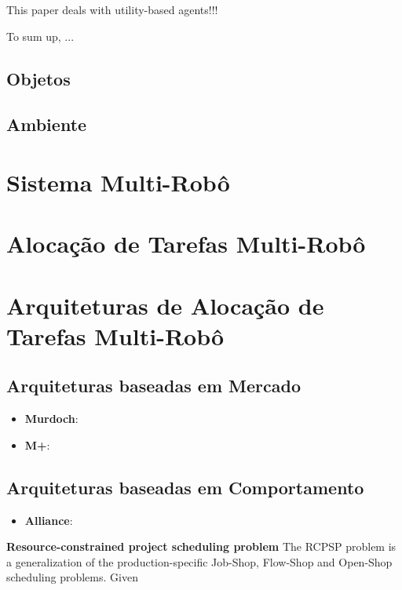         This paper deals with utility-based agents!!!
        
        To sum up, ...
        
        
        \subsection{Objetos}
        
        \subsection{Ambiente}
        
        \section{Sistema Multi-Robô}
        
        \section{Alocação de Tarefas Multi-Robô}
        
        \section{Arquiteturas de Alocação de Tarefas Multi-Robô}
        
        \subsection{Arquiteturas baseadas em Mercado}
        
        \begin{itemize}
            \item \textbf{Murdoch}:
            \item \textbf{M+}:
        \end{itemize}
        
        \subsection{Arquiteturas baseadas em Comportamento}
        
        \begin{itemize}
            \item \textbf{Alliance}:
            
        \end{itemize}
        
        
        \textbf{Resource-constrained project scheduling problem}
        The RCPSP problem is a generalization of the production-specific Job-Shop, Flow-Shop and Open-Shop scheduling problems. Given
        
